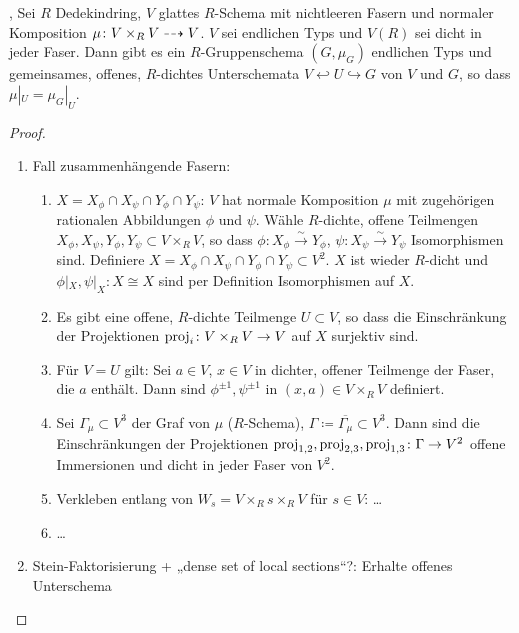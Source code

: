 \documentclass[german]{scrreprt}
\begin{document}
\begin{Satz}\label{thm:weil}
  \cite[Theorem VIII.1.12]{artin},
  \cite[Theorem IV.6.9]{silverman2}
  Sei $R$ Dedekindring, $V$ glattes $R$-Schema mit nichtleeren Fasern
  und normaler Komposition $\mu\colon V\times_R V\dashrightarrow V$.
  $V$ sei endlichen Typs und $V(R)$ sei dicht in jeder Faser.
  Dann gibt es ein $R$-Gruppenschema $(G,\mu_G)$ endlichen Typs und
  gemeinsames, offenes, $R$-dichtes Unterschemata $V\hookleftarrow
  U\hookrightarrow G$ von $V$ und $G$, so dass $\mu|_U=\mu_G|_U$.
  \begin{proof}
    \begin{enumerate}
    \item Fall zusammenhängende Fasern:
      \begin{enumerate}
      \item $X=X_\phi\cap X_\psi\cap Y_\phi\cap Y_\psi$:
        $V$ hat normale Komposition $\mu$ mit zugehörigen rationalen
        Abbildungen $\phi$ und $\psi$.
        Wähle $R$-dichte, offene Teilmengen
        $X_\phi,X_\psi,Y_\phi,Y_\psi\subset V\times_R V$,
        so dass $\phi\colon X_\phi\overset\sim\to Y_\phi$,
        $\psi\colon X_\psi\overset\sim\to Y_\psi$ Isomorphismen sind.
        Definiere $X=X_\phi\cap X_\psi\cap Y_\phi\cap Y_\psi\subset
        V^2$.
        $X$ ist wieder $R$-dicht und $\phi|_X,\psi|_X\colon X\cong X$
        sind per Definition Isomorphismen auf $X$.
      \item Es gibt eine offene, $R$-dichte Teilmenge $U\subset V$, so
        dass die Einschränkung der Projektionen
        $\text{proj}_i\colon V\times_R V\to V$ auf $X$ surjektiv sind.
      \item Für $V=U$ gilt:
        Sei $a\in V$, $x\in V$ in dichter, offener Teilmenge der
        Faser, die $a$ enthält.
        Dann sind $\phi^{\pm1}, \psi^{\pm1}$ in $(x,a)\in V\times_R V$
        definiert.
      \item Sei $\Gamma_\mu\subset V^3$ der Graf von $\mu$
        ($R$-Schema), $\Gamma\coloneqq \overline{\Gamma_\mu}\subset
        V^3$.
        Dann sind die Einschränkungen der Projektionen
        $\text{proj}_{1,2},\text{proj}_{2,3},\text{proj}_{1,3}\colon \Gamma\to V^2$
        offene Immersionen und dicht in jeder Faser von $V^2$.
      \item Verkleben entlang von $W_s=V\times_R s\times_R V$ für
        $s\in V$:
        …
      \item …
      \end{enumerate}
    \item Stein-Faktorisierung + „dense set of local sections“?:
      Erhalte offenes Unterschema 
    \end{enumerate}
  \end{proof}
\end{Satz}
\end{document}

